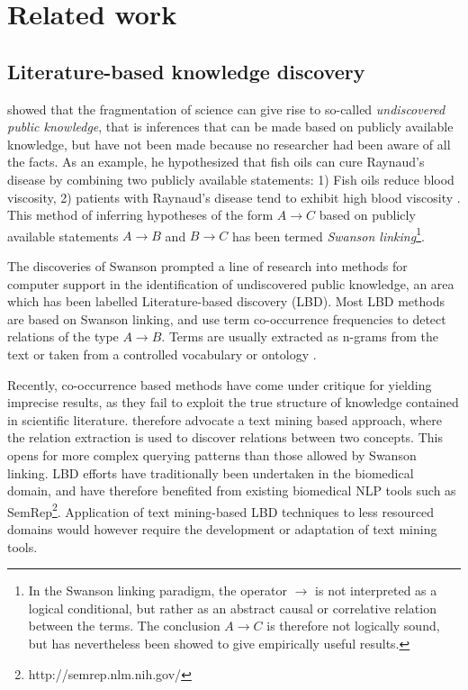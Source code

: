 \documentclass[10pt, a4paper]{article}
\begin{document}
\section{Related work}
\label{sec:related}


\subsection{Literature-based knowledge discovery}

 showed that the fragmentation of science can give rise to so-called \emph{undiscovered public knowledge}, that is inferences that can be made based on publicly available knowledge, but have not been made because no researcher had been aware of all the facts. 
As an example, he hypothesized that fish oils can cure Raynaud's disease by combining two publicly available statements: 1) Fish oils reduce blood viscosity, 2) patients with Raynaud's disease tend to exhibit high blood viscosity \cite{Swanson1986Fishoil}. 
This method of inferring hypotheses of the form $A \to C$ based on publicly available statements $A \to B$ and $B \to C$ has been termed \emph{Swanson linking}\footnote{In the Swanson linking paradigm, the operator $\to$ is not interpreted as a logical conditional, but rather as an abstract causal or correlative relation between the terms. The conclusion $A \to C$ is therefore not logically sound, but has nevertheless been showed to give empirically useful results.}. 

The discoveries of Swanson prompted a line of research into methods for computer support in the identification of undiscovered public knowledge, an area which has been labelled Literature-based discovery (LBD). 
Most LBD methods are based on Swanson linking, and use term co-occurrence frequencies to detect relations of the type $A \to B$. 
Terms are usually extracted as n-grams from the text \cite{Lindsay1999LBDLexicalStat} or taken from a controlled vocabulary or ontology \cite{Weeber2001ConceptsInLBD}.

Recently, co-occurrence based methods have come under critique for yielding imprecise results, as they fail to exploit the true structure of knowledge contained in scientific literature.
 therefore advocate a text mining based approach, where the relation extraction is used to discover relations between two concepts.
This opens for more complex querying patterns than those allowed by Swanson linking.
LBD efforts have traditionally been undertaken in the biomedical domain, and have therefore benefited from existing biomedical NLP tools such as SemRep\footnote{http://semrep.nlm.nih.gov/}.
Application of text mining-based LBD techniques to less resourced domains would however require the development or adaptation of text mining tools.
\end{document}
